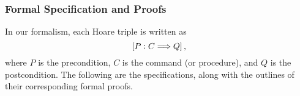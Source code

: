 \subsubsection{Formal Specification and Proofs} 

In our formalism, each Hoare triple is written as
\[
\left[{P}:{C}\Longrightarrow{Q}\right],
\]
where \(P\) is the precondition, \(C\) is the command (or procedure), and \(Q\) is the postcondition. The following are the specifications, along with the outlines of their corresponding formal proofs.
%
%
%
%
%
%
%
%
%
%
%
%
